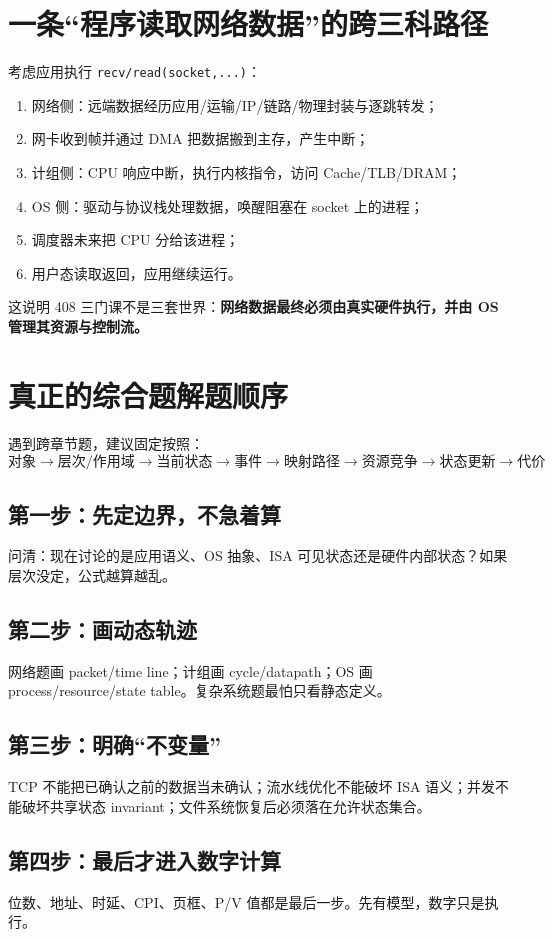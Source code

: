 \documentclass[11pt,a4paper,openany]{ctexbook}
\begin{document}
\section{一条“程序读取网络数据”的跨三科路径}
考虑应用执行 \texttt{recv/read(socket,...)}：
\begin{enumerate}
  \item 网络侧：远端数据经历应用/运输/IP/链路/物理封装与逐跳转发；
  \item 网卡收到帧并通过 DMA 把数据搬到主存，产生中断；
  \item 计组侧：CPU 响应中断，执行内核指令，访问 Cache/TLB/DRAM；
  \item OS 侧：驱动与协议栈处理数据，唤醒阻塞在 socket 上的进程；
  \item 调度器未来把 CPU 分给该进程；
  \item 用户态读取返回，应用继续运行。
\end{enumerate}
这说明 408 三门课不是三套世界：\textbf{网络数据最终必须由真实硬件执行，并由 OS 管理其资源与控制流。}

\section{真正的综合题解题顺序}
遇到跨章节题，建议固定按照：
\[
\boxed{\text{对象}\rightarrow\text{层次/作用域}\rightarrow\text{当前状态}\rightarrow\text{事件}\rightarrow\text{映射路径}\rightarrow\text{资源竞争}\rightarrow\text{状态更新}\rightarrow\text{代价}}
\]

\subsection{第一步：先定边界，不急着算}
问清：现在讨论的是应用语义、OS 抽象、ISA 可见状态还是硬件内部状态？如果层次没定，公式越算越乱。

\subsection{第二步：画动态轨迹}
网络题画 packet/time line；计组画 cycle/datapath；OS 画 process/resource/state table。复杂系统题最怕只看静态定义。

\subsection{第三步：明确“不变量”}
TCP 不能把已确认之前的数据当未确认；流水线优化不能破坏 ISA 语义；并发不能破坏共享状态 invariant；文件系统恢复后必须落在允许状态集合。

\subsection{第四步：最后才进入数字计算}
位数、地址、时延、CPI、页框、P/V 值都是最后一步。先有模型，数字只是执行。
\end{document}
